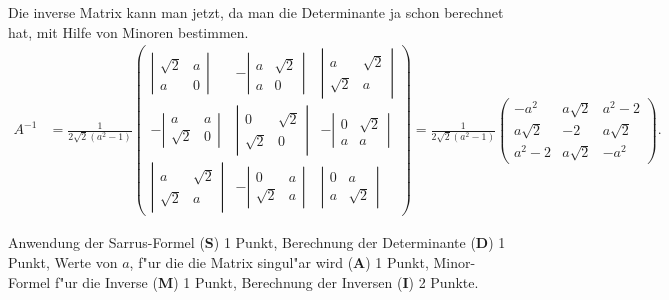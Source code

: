 \begin{loesung}
Die inverse Matrix kann man jetzt, da man die Determinante ja schon berechnet
hat, mit Hilfe von Minoren bestimmen.
\begin{align*}
A^{-1}
&=
\frac1{2\sqrt{2}(a^2-1)}
\begin{pmatrix}
  \left|\begin{matrix}\sqrt{2}&       a\\       a&       0\end{matrix}\right|
&-\left|\begin{matrix}       a&\sqrt{2}\\       a&       0\end{matrix}\right|
& \left|\begin{matrix}       a&\sqrt{2}\\\sqrt{2}&       a\end{matrix}\right|
\\
 -\left|\begin{matrix}       a&       a\\\sqrt{2}&       0\end{matrix}\right|
& \left|\begin{matrix}       0&\sqrt{2}\\\sqrt{2}&       0\end{matrix}\right|
&-\left|\begin{matrix}       0&\sqrt{2}\\       a&       a\end{matrix}\right|
\\
  \left|\begin{matrix}       a&\sqrt{2}\\\sqrt{2}&       a\end{matrix}\right|
&-\left|\begin{matrix}       0&       a\\\sqrt{2}&       a\end{matrix}\right|
& \left|\begin{matrix}       0&       a\\       a&\sqrt{2}\end{matrix}\right|
\end{pmatrix}
=
\frac1{2\sqrt{2}(a^2-1)}
\begin{pmatrix}
-a^2&a\sqrt{2}&a^2-2\\
a\sqrt{2}&-2&a\sqrt{2}\\
a^2-2&a\sqrt{2}&-a^2
\end{pmatrix}.
\end{align*}
\end{loesung}

\begin{bewertung}
Anwendung der Sarrus-Formel ({\bf S}) 1 Punkt,
Berechnung der Determinante ({\bf D}) 1 Punkt,
Werte von $a$, f"ur die die Matrix singul"ar wird ({\bf A}) 1 Punkt,
Minor-Formel f"ur die Inverse ({\bf M}) 1 Punkt,
Berechnung der Inversen ({\bf I}) 2 Punkte.
\end{bewertung}
